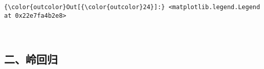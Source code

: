 \documentclass[11pt]{article}
\begin{document}
\begin{Verbatim}[commandchars=\\\{\}]
{\color{outcolor}Out[{\color{outcolor}24}]:} <matplotlib.legend.Legend at 0x22e7fa4b2e8>
\end{Verbatim}
            
    \begin{center}
    \end{center}
    { \hspace*{\fill} \\}
    
    \subsection{二、岭回归}\label{ux4e8cux5cadux56deux5f52}
\end{document}
